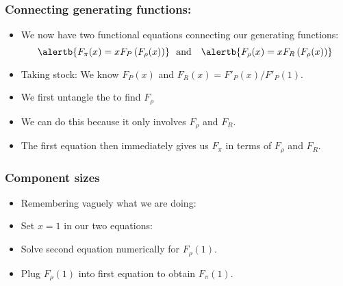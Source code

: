 \begin{frame}[label=]
  \frametitle{Connecting generating functions:}

  \begin{itemize}
  \item We now have two functional equations
    connecting our generating functions:
    $$
    \alertb{
      F_{\pi}(x)
      =
      x F_{P}
      \left(
        F_{\rho} (x)
      \right)
    }
    \mbox{\ \  and \ \ }
    \alertb{
    F_{\rho}(x)
    =
    x F_{R}
    \left(
      F_{\rho} (x)
    \right)
    }
    $$
  \item<2->
    Taking stock: We know $F_P(x)$ and $F_R(x)=F'_P(x)/F'_P(1)$.
  \item<3->
    We first untangle the  to find $F_\rho$
  \item<4->
    We can do this because it \alert{only involves} $F_\rho$ and $F_R$.
  \item<5->
    The first equation then immediately gives us $F_\pi$ in
    terms of $F_\rho$ and $F_R$.
  \end{itemize}

\end{frame}

\begin{frame}[label=]
  \frametitle{Component sizes}
  
  \begin{itemize}
  \item<1-> 
    Remembering vaguely what we are doing:\\
    \medskip
  \item<3-> Set $x=1$ in our two equations:
  \item<5->
    Solve second equation numerically for $F_{\rho}(1)$.
  \item<6->
    Plug $F_{\rho}(1)$ into first equation to
    obtain $F_{\pi}(1)$.
  \end{itemize}

\end{frame}

